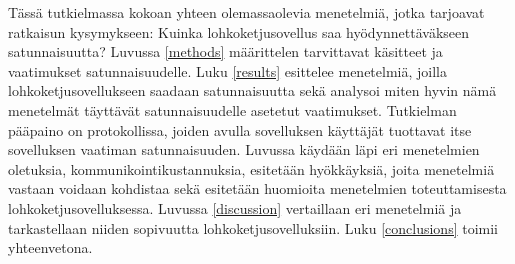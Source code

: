 Tässä tutkielmassa kokoan yhteen olemassaolevia menetelmiä, jotka tarjoavat ratkaisun kysymykseen: Kuinka lohkoketjusovellus saa hyödynnettäväkseen satunnaisuutta? Luvussa \ref{methods} määrittelen tarvittavat käsitteet ja vaatimukset satunnaisuudelle. Luku \ref{results} esittelee menetelmiä, joilla lohkoketjusovellukseen saadaan satunnaisuutta sekä analysoi miten hyvin nämä menetelmät täyttävät satunnaisuudelle asetetut vaatimukset. Tutkielman pääpaino on protokollissa, joiden avulla sovelluksen käyttäjät tuottavat itse sovelluksen vaatiman satunnaisuuden. Luvussa käydään läpi eri menetelmien oletuksia, kommunikointikustannuksia, esitetään hyökkäyksiä, joita menetelmiä vastaan voidaan kohdistaa sekä esitetään huomioita menetelmien toteuttamisesta lohkoketjusovelluksessa. Luvussa \ref{discussion} vertaillaan eri menetelmiä ja tarkastellaan niiden sopivuutta lohkoketjusovelluksiin. Luku \ref{conclusions} toimii yhteenvetona.